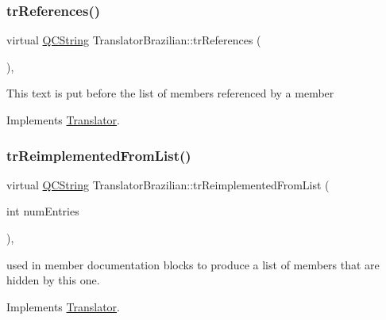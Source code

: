 \mbox{\label{class_translator_brazilian_a91fe4dc7abe38f86ba3e3bd5857b6e5a}} 
\subsubsection{\texorpdfstring{trReferences()}{trReferences()}}
{\footnotesize\ttfamily virtual \mbox{\hyperlink{class_q_c_string}{Q\+C\+String}} Translator\+Brazilian\+::tr\+References (\begin{DoxyParamCaption}{ }\end{DoxyParamCaption})\hspace{0.3cm}{\ttfamily [inline]}, {\ttfamily [virtual]}}

This text is put before the list of members referenced by a member 

Implements \mbox{\hyperlink{class_translator}{Translator}}.

\mbox{\label{class_translator_brazilian_a91ecee551afbabf76b4432af05832e0e}} 
\subsubsection{\texorpdfstring{trReimplementedFromList()}{trReimplementedFromList()}}
{\footnotesize\ttfamily virtual \mbox{\hyperlink{class_q_c_string}{Q\+C\+String}} Translator\+Brazilian\+::tr\+Reimplemented\+From\+List (\begin{DoxyParamCaption}\item[{int}]{num\+Entries }\end{DoxyParamCaption})\hspace{0.3cm}{\ttfamily [inline]}, {\ttfamily [virtual]}}

used in member documentation blocks to produce a list of members that are hidden by this one. 

Implements \mbox{\hyperlink{class_translator}{Translator}}.

\mbox{\label{class_translator_brazilian_a3e9d5e6cc682e92f10a1a6186422ca8f}} 
